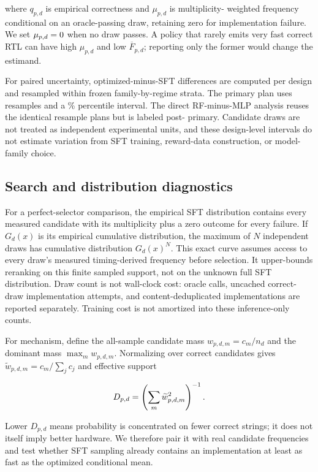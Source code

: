 where $q_{p,d}$ is empirical correctness and $\mu_{p,d}$ is multiplicity-
weighted frequency conditional on an oracle-passing draw, retaining zero for
implementation failure.  We set $\mu_{p,d}=0$ when no draw passes.  A policy
that rarely emits very fast correct RTL can have high $\mu_{p,d}$ and low
$\overline{F}_{p,d}$; reporting only the former would change the estimand.

For paired uncertainty, optimized-minus-SFT differences are computed per
design and resampled within frozen family-by-regime strata.  The primary plan
uses  resamples and a
\% percentile interval.  The direct
RF-minus-MLP analysis reuses the identical resample plans but is labeled post-
primary.  Candidate draws are not treated as independent experimental units,
and these design-level intervals do not estimate variation from SFT training,
reward-data construction, or model-family choice.

\subsection{Search and distribution diagnostics}

For a perfect-selector comparison, the empirical SFT distribution contains
every measured candidate with its multiplicity plus a zero outcome for every
failure.  If $G_d(x)$ is its empirical cumulative distribution, the maximum of
$N$ independent draws has cumulative distribution $G_d(x)^N$.  This exact
curve assumes access to every draw's measured timing-derived frequency before
selection.  It upper-bounds reranking on this finite sampled support, not on the
unknown full SFT distribution.  Draw count is not wall-clock cost: oracle calls,
uncached correct-draw implementation attempts, and content-deduplicated
implementations are reported separately.  Training cost is not amortized into
these inference-only counts.

For mechanism, define the all-sample candidate mass
$w_{p,d,m}=c_m/n_d$ and the dominant mass $\max_m w_{p,d,m}$.  Normalizing over
correct candidates gives $\widetilde{w}_{p,d,m}=c_m/\sum_jc_j$ and effective
support

\begin{equation}
D_{p,d}=\left(\sum_m\widetilde{w}_{p,d,m}^{2}\right)^{-1}.
\label{eq:effective-support}
\end{equation}

Lower $D_{p,d}$ means probability is concentrated on fewer correct strings; it
does not itself imply better hardware.  We therefore pair it with real
candidate frequencies and test whether SFT sampling already contains an
implementation at least as fast as the optimized conditional mean.

